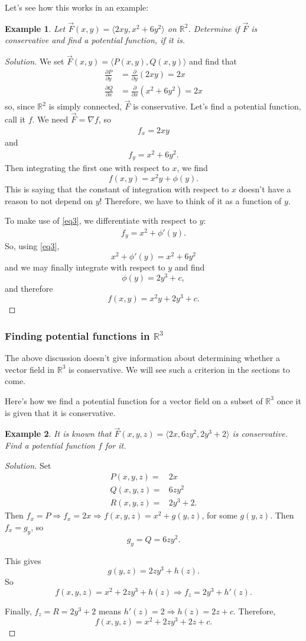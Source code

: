 \documentclass[12pt]{article}
\newcommand{\p}{\partial}
\newcommand{\R}{ \mathbb{R}}
\newcommand{\vF}{\vec{F}}
\renewcommand{\lg}{\langle}
\newcommand{\rg}{\rangle}
\newcommand{\Q}{\frac{\p Q}{\p x}}
\renewcommand{\P}{\frac{\p P}{\p y}}
\let\implies\Rightarrow
\newenvironment{solution}
  {\begin{proof}[Solution]}
  {\end{proof}
  
  }
\newtheorem{example}{Example}
\begin{document}
Let's see how this works in an example:
\begin{example}
Let $\vF(x,y)=\lg 2xy, x^2+6y^2\rg$ on $\R^2$. Determine if $\vF$ is conservative and find a potential function, if it is.
\end{example}
\begin{solution}
We set $\vF(x,y)=\lg P(x,y), Q(x,y)\rg$ and find that \begin{align*}
\P&=\frac{\p}{\p y}(2xy)=2x\\
\Q&=\frac{\p}{\p x}(x^2+6y^2)=2x
\end{align*}
so, since $\R^2 $ is simply connected, $\vF$ is conservative. Let's find a potential function, call it $f$. We need $\vF = \nabla f$, so \begin{align}
f_x=2xy\label{eq2}
\end{align} and \begin{align}
f_y=x^2+6y^2.\label{eq3}
\end{align}
Then integrating the first one with respect to $x$, we find $$f(x,y)=x^2y+\phi(y).$$
This is saying that the constant of integration with respect to $x$ doesn't have a reason to not depend on $y$! Therefore, we have to think of it as a function of $y$.

To make use of \eqref{eq3}, we differentiate  with respect to $y$:
\begin{align}
f_y=x^2+\phi '(y).
\end{align}
So, using  \eqref{eq3}, $$x^2+\phi '(y)=x^2+6y^2$$ and we may finally integrate with respect to $y$ and find $$\phi(y)=2y^3+c,$$ and therefore $$f(x,y)=x^2y+2y^3+c.$$
\end{solution}

\subsubsection*{Finding potential functions in $\R^3$}
The above discussion doesn't give information about determining whether a vector field in $\R^3$ is conservative. We will see such a criterion in the sections to come.

Here's how we find a potential function for a vector field on a subset of $\R^3$ once it is given that it is conservative.
\begin{example}
It is known that $\vF(x,y,z)=\lg 2x, 6zy^2, 2y^3+2\rg $ is conservative. Find a potential function $f$ for it.
\end{example}
\begin{solution}Set
\begin{align}
P(x,y,z)=&2x\\
Q(x,y,z)=&6zy^2\\
R(x,y,z)=&2y^3+2.
\end{align}
Then $f_x=P\implies f_x=2x\implies f(x,y,z)=x^2+g(y,z)$, for some $g(y,z)$. Then $f_x=g_y$, so $$g_y=Q=6zy^2.$$

This gives $$g(y,z)=2zy^3+h(z).$$ So $$f(x,y,z)=x^2+2zy^3+h(z)\implies f_z=2y^3+h'(z).$$

Finally, $f_z=R=2y^3+2$ means $h'(z)=2\implies h(z)=2z+c$. Therefore, $$f(x,y,z)=x^2+2zy^3+2z+c.$$
\end{solution}
\end{document}
